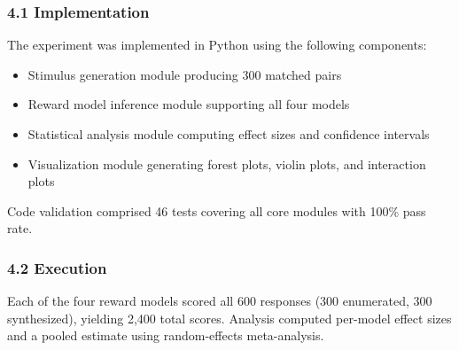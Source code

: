 
\subsubsection{4.1 Implementation}

The experiment was implemented in Python using the following components:
\begin{itemize}
\item Stimulus generation module producing 300 matched pairs
\item Reward model inference module supporting all four models
\item Statistical analysis module computing effect sizes and confidence intervals
\item Visualization module generating forest plots, violin plots, and interaction plots
\end{itemize}

Code validation comprised 46 tests covering all core modules with 100\% pass rate.

\subsubsection{4.2 Execution}

Each of the four reward models scored all 600 responses (300 enumerated, 300 synthesized), yielding 2,400 total scores. Analysis computed per-model effect sizes and a pooled estimate using random-effects meta-analysis.
